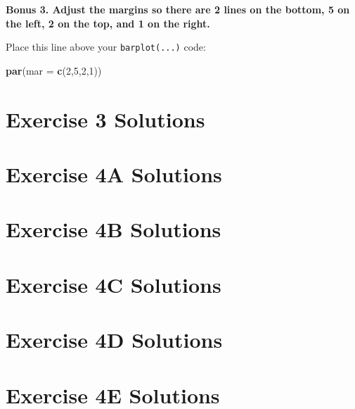 \documentclass[]{book}
\newenvironment{Shaded}{\begin{snugshade}}{\end{snugshade}}
\newcommand{\KeywordTok}[1]{\textcolor[rgb]{0.13,0.29,0.53}{\textbf{#1}}}
\newcommand{\DataTypeTok}[1]{\textcolor[rgb]{0.13,0.29,0.53}{#1}}
\newcommand{\DecValTok}[1]{\textcolor[rgb]{0.00,0.00,0.81}{#1}}
\newcommand{\NormalTok}[1]{#1}
\theoremstyle{definition}
\theoremstyle{definition}
\theoremstyle{definition}
\theoremstyle{remark}
\begin{document}
\textbf{Bonus 3. Adjust the margins so there are 2 lines on the bottom,
5 on the left, 2 on the top, and 1 on the right.}

Place this line above your \texttt{barplot(...)} code:

\begin{Shaded}
\begin{Highlighting}[]
\KeywordTok{par}\NormalTok{(}\DataTypeTok{mar =} \KeywordTok{c}\NormalTok{(}\DecValTok{2}\NormalTok{,}\DecValTok{5}\NormalTok{,}\DecValTok{2}\NormalTok{,}\DecValTok{1}\NormalTok{))}
\end{Highlighting}
\end{Shaded}

\hypertarget{ex3-answers}{\section*{Exercise 3
Solutions}\label{ex3-answers}}

\hypertarget{ex4a-answers}{\section*{Exercise 4A
Solutions}\label{ex4a-answers}}

\hypertarget{ex4b-answers}{\section*{Exercise 4B
Solutions}\label{ex4b-answers}}

\hypertarget{ex4c-answers}{\section*{Exercise 4C
Solutions}\label{ex4c-answers}}

\hypertarget{ex4d-answers}{\section*{Exercise 4D
Solutions}\label{ex4d-answers}}

\hypertarget{ex4e-answers}{\section*{Exercise 4E
Solutions}\label{ex4e-answers}}
\end{document}
